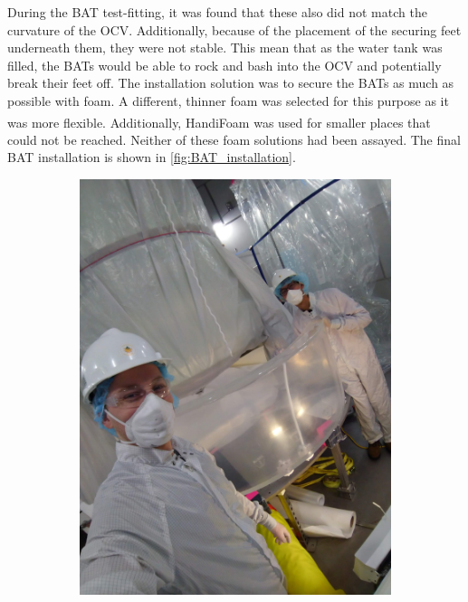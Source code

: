 \par
During the BAT test-fitting, it was found that these also did not match the curvature of the OCV.
Additionally, because of the placement of the securing feet underneath them, they were not stable.
This mean that as the water tank was filled, the BATs would be able to rock and bash into the OCV and potentially break their feet off.
The installation solution was to secure the BATs as much as possible with foam.
A different, thinner foam was selected for this purpose as it was more flexible.
Additionally, HandiFoam\textsuperscript{\textregistered} was used for smaller places that could not be reached.
Neither of these foam solutions had been assayed.
The final BAT installation is shown in \autoref{fig:BAT_installation}.

\begin{figure}[!tbph]
\begin{subfigure}{.5\textwidth}
  \centering
  \includegraphics[angle=90, width=\linewidth]{Figures/Construction/BAT_installation.jpg}

\end{subfigure}
\end{figure}

